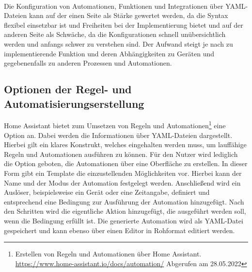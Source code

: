     \\
    Die Konfiguration von Automationen, Funktionen und Integrationen über YAML-Dateien kann auf der einen Seite als Stärke gewertet werden, 
    da die Syntax flexibel einsetzbar ist und Freiheiten bei der Implementierung bietet und auf der anderen Seite als Schwäche, da die 
    Konfigurationen schnell unübersichtlich werden und anfangs schwer zu verstehen sind. Der Aufwand steigt je nach zu implementierende 
    Funktion und deren Abhängigkeiten zu Geräten und gegebenenfalls zu anderen Prozessen und Automationen. 

    \subsection{Optionen der Regel- und Automatisierungserstellung}
        Home Assistant bietet zum Umsetzen von Regeln und Automationen\footnote{Erstellen von Regeln und Automationen über Home Assistant. \url{https://www.home-assistant.io/docs/automation/} Abgerufen am 28.05.2022} 
        eine Option an. Dabei werden die Informationen über 
        YAML-Dateien dargestellt. Hierbei gilt ein klares Konstrukt, welches eingehalten werden muss, um lauffähige Regeln 
        und Automationen ausführen zu können. Für den Nutzer wird lediglich die Option geboten, die Automationen über eine 
        Oberfläche zu erstellen. In dieser Form gibt ein Template die einzustellenden Möglichkeiten vor. Hierbei kann 
        der Name und der Modus der Automation festgelegt werden. Anschließend wird ein Auslöser, beispielsweise ein Gerät 
        oder eine Zeitangabe, definiert und entsprechend eine Bedingung zur Ausführung der Automation hinzugefügt. Nach den 
        Schritten wird die eigentliche Aktion hinzugefügt, die ausgeführt werden soll, wenn die Bedingung erfüllt ist. Die 
        generierte Automation wird als YAML-Datei gespeichert und kann ebenso über einen Editor in Rohformat editiert werden.

